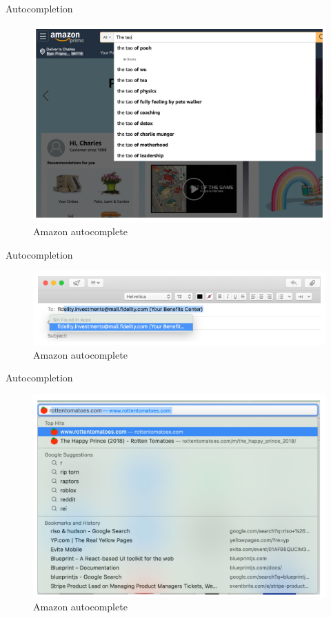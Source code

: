 \documentclass{beamer}
\begin{document}
\begin{frame}[t]{Autocompletion}
	\begin{figure}[h]
		\centering
		\includegraphics[scale=0.6]{images/lec08-pic50.png}
		\caption{Amazon autocomplete}
	\end{figure}
\end{frame}

\begin{frame}[t]{Autocompletion}
	\begin{figure}[h]
		\centering
		\includegraphics[scale=0.6]{images/lec08-pic51.png}
		\caption{Amazon autocomplete}
	\end{figure}
\end{frame}

\begin{frame}[t]{Autocompletion}
	\begin{figure}[h]
		\centering
		\includegraphics[scale=0.6]{images/lec08-pic52.png}
		\caption{Amazon autocomplete}
	\end{figure}
\end{frame}
\end{document}
